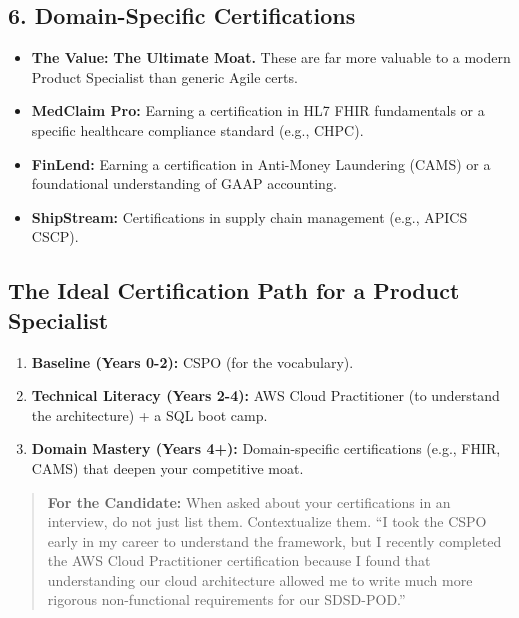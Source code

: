 \subsection{6. Domain-Specific
Certifications}\label{domain-specific-certifications}

\begin{itemize}
\tightlist
\item
  \textbf{The Value:} \textbf{The Ultimate Moat.} These are far more
  valuable to a modern Product Specialist than generic Agile certs.
\item
  \textbf{MedClaim Pro:} Earning a certification in HL7 FHIR
  fundamentals or a specific healthcare compliance standard (e.g.,
  CHPC).
\item
  \textbf{FinLend:} Earning a certification in Anti-Money Laundering
  (CAMS) or a foundational understanding of GAAP accounting.
\item
  \textbf{ShipStream:} Certifications in supply chain management (e.g.,
  APICS CSCP).
\end{itemize}

\subsection{The Ideal Certification Path for a Product
Specialist}\label{the-ideal-certification-path-for-a-product-specialist}

\begin{enumerate}
\def\labelenumi{\arabic{enumi}.}
\tightlist
\item
  \textbf{Baseline (Years 0-2):} CSPO (for the vocabulary).
\item
  \textbf{Technical Literacy (Years 2-4):} AWS Cloud Practitioner (to
  understand the architecture) + a SQL boot camp.
\item
  \textbf{Domain Mastery (Years 4+):} Domain-specific certifications
  (e.g., FHIR, CAMS) that deepen your competitive moat.
\end{enumerate}

\begin{quote}
\textbf{For the Candidate:} When asked about your certifications in an
interview, do not just list them. Contextualize them. ``I took the CSPO
early in my career to understand the framework, but I recently completed
the AWS Cloud Practitioner certification because I found that
understanding our cloud architecture allowed me to write much more
rigorous non-functional requirements for our SDSD-POD.''
\end{quote}

